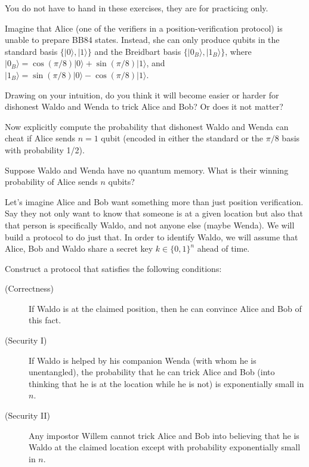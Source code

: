 \documentclass[a4paper,10pt,landscape,twocolumn]{scrartcl}
\newcommand{\ket}[1]{\lvert #1 \rangle}
\begin{document}
\practiceproblems

{\sffamily\noindent
You do not have to hand in these exercises, they are for practicing only. %
}

\begin{exercise}
	Imagine that Alice (one of the verifiers in a position-verification protocol) is unable to prepare BB84 states. Instead, she can only produce qubits in the standard basis $\{\ket0, \ket1\}$ and the Breidbart basis $\{\ket{0_B}, \ket{1_B}\}$, where $\ket{0_B} = \cos(\pi/8)\ket0 + \sin(\pi/8)\ket1$, and $\ket{1_B} = \sin(\pi/8)\ket0 -\cos(\pi/8)\ket1$.
	\begin{subex}
		Drawing on your intuition, do you think it will become easier or harder for dishonest Waldo and Wenda to trick Alice and Bob? Or does it not matter?
	\end{subex}
	\begin{subex}
		Now explicitly compute the probability that dishonest Waldo and Wenda can cheat if Alice sends $n = 1$ qubit (encoded in either the standard or the $\pi/8$ basis with probability 1/2).
	\end{subex}
	\begin{subex}
		Suppose Waldo and Wenda have no quantum memory. What is their winning probability of Alice sends $n$ qubits?
	\end{subex}
\end{exercise}

\begin{exercise}
	Let's imagine Alice and Bob want something more than just position verification. Say they not only want to know that someone is at a given location but also that that person is specifically Waldo, and not anyone else (maybe Wenda). We will build a protocol to do just that. In order to identify Waldo, we will assume that Alice, Bob and Waldo share a secret key $k \in \{0,1\}^n$ ahead of time.
	
	Construct a protocol that satisfies the following conditions:
	\begin{description}
		\item[(Correctness)] If Waldo is at the claimed position, then he can convince Alice and Bob of this fact.
		\item[(Security I)] If Waldo is helped by his companion Wenda (with whom he is unentangled), the probability that he can trick Alice and Bob (into thinking that he is at the location while he is not) is exponentially small in $n$.
		\item[(Security II)] Any impostor Willem cannot trick Alice and Bob into believing that he is Waldo at the claimed location except with probability exponentially small in $n$.
	\end{description}
\end{exercise}
\end{document}
